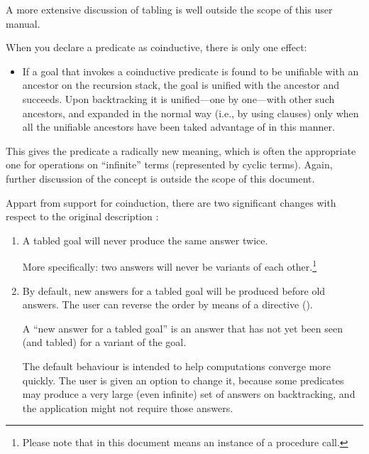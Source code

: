 A more extensive discussion of tabling is well outside the scope of this user
manual.


\Breakup

When you declare a predicate as coinductive,
there is only one effect:
\begin{itemize}
  \item If a goal that invokes a coinductive predicate is found to be
    unifiable with an ancestor on the recursion stack, the goal is unified
    with the ancestor and succeeds.  Upon backtracking it is unified---one by
    one---with other such ancestors, and expanded in the normal way (i.e., by
    using clauses) only when all the unifiable ancestors have been taked
    advantage of in this manner.
\end{itemize}
This gives the predicate a radically new meaning, which is often the
appropriate one for operations on ``infinite'' terms (represented by cyclic
terms).  Again, further discussion of the concept is outside the scope of
this document.

\Breakup

Appart from support for coinduction, there are two significant changes with
respect to the original description \cite{guo-gupta-dra}:
\begin{enumerate}

\item A tabled goal will never produce the same answer twice.

  More specifically: two answers will never be variants of each
  other.\footnote{
  Please note that in this document  means an instance of a
  procedure call.}

\item By default, new answers for a tabled goal will be produced before old
  answers.  The user can reverse the order by means of a directive
  ().

  A ``new answer for a tabled goal'' is an answer that has not yet been seen
  (and tabled) for a variant of the goal.

  The default behaviour is intended to help computations converge more
  quickly.  The user is given an option to change it, because some predicates
  may produce a very large (even infinite) set of answers on backtracking,
  and the application might not require those answers.
\end{enumerate}
